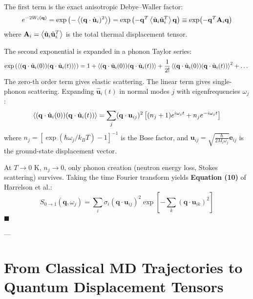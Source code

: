 \documentclass[11pt,a4paper]{article}
\theoremstyle{definition}
\begin{document}
The first term is the exact anisotropic Debye--Waller factor:
\begin{equation}
e^{-2W_i(\mathbf{q})} = \exp\left( -\ev{(\mathbf{q}\cdot \hat{\mathbf{u}}_i)^2} \right) = \exp\left( -\mathbf{q}^T \ev{\hat{\mathbf{u}}_i \hat{\mathbf{u}}_i^T} \mathbf{q} \right) \equiv \exp(-\mathbf{q}^T \mathbf{A}_i \mathbf{q})
\end{equation}
where $\mathbf{A}_i = \ev{\hat{\mathbf{u}}_i \hat{\mathbf{u}}_i^T}$ is the total thermal displacement tensor.

The second exponential is expanded in a phonon Taylor series:
\begin{equation}
\exp\left( \ev{(\mathbf{q}\cdot \hat{\mathbf{u}}_i(0))(\mathbf{q}\cdot \hat{\mathbf{u}}_i(t))} \right) = 1 + \ev{(\mathbf{q}\cdot \hat{\mathbf{u}}_i(0))(\mathbf{q}\cdot \hat{\mathbf{u}}_i(t))} + \frac{1}{2!} \ev{(\mathbf{q}\cdot \hat{\mathbf{u}}_i(0))(\mathbf{q}\cdot \hat{\mathbf{u}}_i(t))}^2 + \dots
\end{equation}
The zero-th order term gives elastic scattering. The linear term gives single-phonon scattering. Expanding $\hat{\mathbf{u}}_i(t)$ in normal modes $j$ with eigenfrequencies $\omega_j$:
\begin{equation}
\ev{(\mathbf{q}\cdot \hat{\mathbf{u}}_i(0))(\mathbf{q}\cdot \hat{\mathbf{u}}_i(t))} = \sum_j (\mathbf{q} \cdot \mathbf{u}_{ij})^2 \left[ (n_j + 1) e^{i\omega_j t} + n_j e^{-i\omega_j t} \right]
\end{equation}
where $n_j = [\exp(\hbar\omega_j / k_B T) - 1]^{-1}$ is the Bose factor, and $\mathbf{u}_{ij} = \sqrt{\frac{\hbar}{2 M_i \omega_j}} \mathbf{e}_{ij}$ is the ground-state displacement vector.

At $T \to 0\text{ K}$, $n_j \to 0$, only phonon creation (neutron energy loss, Stokes scattering) survives. Taking the time Fourier transform yields \textbf{Equation (10)} of Harrelson et al.:
\begin{equation}
S_{0 \to 1}(\mathbf{q}, \omega_j) = \sum_i \sigma_i (\mathbf{q} \cdot \mathbf{u}_{ij})^2 \exp\left[ -\sum_k (\mathbf{q} \cdot \mathbf{u}_{ik})^2 \right]
\label{eq:exact_s1}
\end{equation}
$\blacksquare$

---

\section{From Classical MD Trajectories to Quantum Displacement Tensors}
\label{sec:classical_to_quantum}
\end{document}

